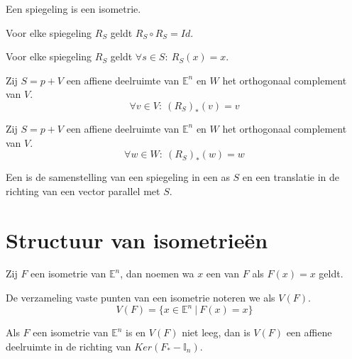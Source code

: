 \documentclass[main.tex]{subfiles}
\begin{document}
\begin{st}
  Een spiegeling is een isometrie.
\end{st}

\begin{st}
  Voor elke spiegeling $R_{S}$ geldt $R_{S} \circ R_{S} = Id$.
\end{st}

\begin{st}
  Voor elke spiegeling $R_{S}$ geldt $\forall s \in S:\ R_{S}(x) = x$.
\end{st}

\begin{lem}
  Zij $S=p+V$ een affiene deelruimte van $\mathbb{E}^{n}$ en $W$ het orthogonaal complement van $V$.
  \[ \forall v\in V:\ (R_{S})_{*}(v) = v \]
\end{lem}

\begin{lem}
  Zij $S=p+V$ een affiene deelruimte van $\mathbb{E}^{n}$ en $W$ het orthogonaal complement van $V$.
  \[ \forall w\in W:\ (R_{S})_{*}(w) = w \]
\end{lem}

\begin{de}
  Een  is de samenstelling van een spiegeling in een as $S$ en een translatie in de richting van een vector parallel met $S$.
\end{de}

\section{Structuur van isometrie\"en}
\label{sec:struct-van-isom}

\begin{de}
  Zij $F$ een isometrie van $\mathbb{E}^{n}$, dan noemen wa $x$ een  van $F$ als $F(x)=x$ geldt.
\end{de}

\begin{de}
  De verzameling vaste punten van een isometrie noteren we als $V(F)$.
  \[ V(F) = \{ x \in \mathbb{E}^{n} \ |\ F(x) = x \} \]
\end{de}

\begin{st}
  Als $F$ een isometrie van $\mathbb{E}^{n}$ is en $V(F)$ niet leeg, dan is $V(F)$ een affiene deelruimte in de richting van $Ker(F_{*}-\mathbb{I}_{n})$.
\end{st}
\end{document}
